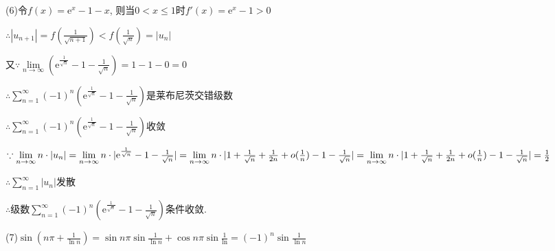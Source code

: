 \documentclass[12pt,UTF8]{ctexart}
\newcommand\Lim[0]{\lim\limits_{n\rightarrow\infty}}
\newcommand\Ser[1]{\sum_{n=#1}^\infty}
\newcommand{\me}[0]{\mathrm e}
\begin{document}
\begin{enumerate}
%

(6)令$f(x)=\me^x-1-x$, 则当$0<x\leq1$时$f'(x)=\me^x-1>0$

$\therefore|u_{n+1}|=f(\frac1{\sqrt{n+1}})<f(\frac1{\sqrt n})=|u_n|$

又$\because\Lim(\mathrm e^{\frac1{\sqrt n}}-1-\frac1{\sqrt n})=1-1-0=0$

$\therefore\Ser{1}(-1)^n(\mathrm e^{\frac1{\sqrt n}}-1-\frac1{\sqrt n})$是莱布尼茨交错级数

$\therefore\Ser{1}(-1)^n(\mathrm e^{\frac1{\sqrt n}}-1-\frac1{\sqrt n})$收敛

$\because\Lim n\cdot|u_n|=\Lim n\cdot|\me^{\frac1{\sqrt n}}-1-\frac1{\sqrt n}|=\Lim n\cdot|1+\frac1{\sqrt n}+\frac1{2n}+o(\frac1n)-1-\frac1{\sqrt n}|\\
=\Lim n\cdot|1+\frac1{\sqrt n}+\frac1{2n}+o(\frac1n)-1-\frac1{\sqrt n}|=\frac12$

$\therefore\Ser1|u_n|$发散

$\therefore$级数$\Ser{1}(-1)^n(\mathrm e^{\frac1{\sqrt n}}-1-\frac1{\sqrt n})$条件收敛.

(7)$\sin(n\pi+\frac1{\ln n})=\sin n\pi\sin\frac1{\ln n}+\cos n\pi\sin\frac1{\ln}=(-1)^n\sin\frac1{\ln n}$


\end{enumerate}
\end{document}
